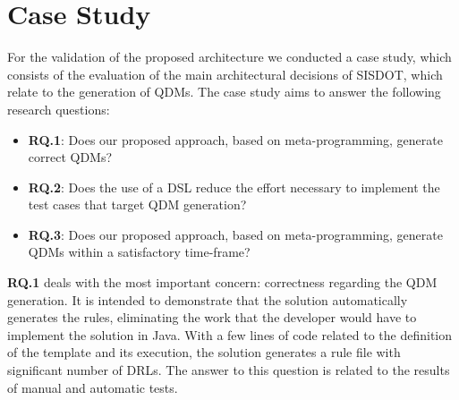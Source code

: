 \section{Case Study}
\label{sec:case_study} 


For the validation of the proposed architecture we conducted a case study, which consists of the evaluation of the main 
architectural decisions of SISDOT, which relate to the generation of QDMs. The case study aims to answer the 
following research questions:

\begin{itemize}

\item \textbf{RQ.1}: Does our proposed approach, based on meta-programming, generate correct QDMs?

\item \textbf{RQ.2}: Does the use of a DSL reduce the effort necessary to implement the test cases that target QDM generation? 

\item \textbf{RQ.3}: Does our proposed approach, based on meta-programming, generate QDMs within a satisfactory time-frame?

\end{itemize}


\textbf{RQ.1} deals with the most important concern: correctness regarding the QDM generation. It is intended 
to demonstrate that the solution automatically generates the rules, eliminating the work that the developer 
would have to implement the solution in Java. With a few lines of code related to the definition of the template 
and its execution, the solution generates a rule file with significant number of DRLs. The answer to this question 
is related to the results of manual and automatic tests.

